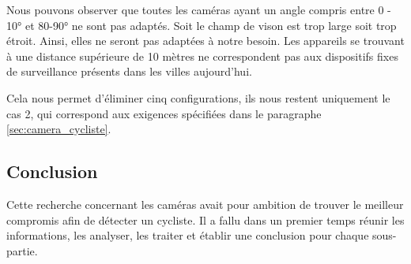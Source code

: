 Nous pouvons observer que toutes les caméras ayant un angle compris entre 0 - 10° et 80-90° ne sont pas adaptés.
Soit le champ de vison est trop large soit trop étroit. Ainsi, elles ne seront pas adaptées à notre besoin.
Les appareils se trouvant à une distance supérieure de 10 mètres ne correspondent pas aux dispositifs fixes de surveillance présents dans les villes aujourd'hui.

Cela nous permet d'éliminer cinq configurations, ils nous restent uniquement le cas 2, 
qui correspond aux exigences spécifiées dans le paragraphe \ref{sec:camera_cycliste}.


\subsection{Conclusion}
\label{Conclusion}
Cette recherche concernant les caméras avait pour ambition de trouver le meilleur compromis afin de détecter un cycliste.
Il a fallu dans un premier temps réunir les informations, les analyser, les traiter et établir une conclusion pour chaque sous-partie.

